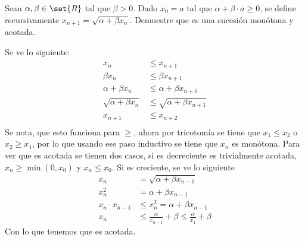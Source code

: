 \documentclass{ayudantia}
\begin{document}
\begin{prob}
    Sean \(\alpha,\beta\in\set{R}\) tal que \(\beta>0\). Dado \(x_0=a\) tal que \(\alpha+\beta\cdot a\geq0\), se define recursivamente \(x_{n+1}=\sqrt{\alpha+\beta x_n}\). Demuestre que es una sucesión monótona y acotada.
\end{prob}

\begin{ans}
    \begin{sol}
        Se ve lo siguiente:
        \begin{align*}
            x_n                     & \leq x_{n+1}                     \\
            \beta x_n               & \leq \beta x_{n+1}               \\
            \alpha+\beta x_n        & \leq \alpha+\beta x_{n+1}        \\
            \sqrt{\alpha+\beta x_n} & \leq \sqrt{\alpha+\beta x_{n+1}} \\
            x_{n+1}                 & \leq x_{n+2}                     \\
        \end{align*}
        Se nota, que esto funciona para \(\geq\), ahora por tricotomía se tiene que \(x_1\leq x_2\) o \(x_2\geq x_1\), por lo que usando ese paso inductivo se tiene que \(x_n\) es monótona.
        Para ver que es acotada se tienen dos casos, si es decreciente es trivialmente acotada, \(x_n\geq\min(0,x_0)\) y \(x_n\leq x_0\). Si es creciente, se ve lo siguiente
        \begin{align*}
            x_n & =\sqrt{\alpha+\beta x_{n-1}} \\
            x_n^2 & =\alpha+\beta x_{n-1} \\
            x_n\cdot x_{n-1} & \leq x_n^2=\alpha+\beta x_{n-1} \\
            x_n&\leq\frac\alpha{x_{n-1}}+\beta\leq\frac\alpha{x_1}+\beta
        \end{align*}
        Con lo que tenemos que es acotada.
    \end{sol}
\end{ans}
\end{document}
